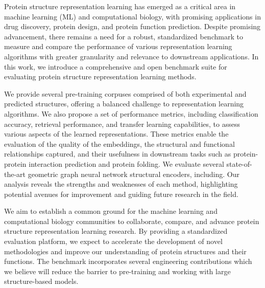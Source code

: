 Protein structure representation learning has emerged as a critical area in machine learning (ML) and computational biology, with promising applications in drug discovery, protein design, and protein function prediction. Despite promising advancement, there remains a need for a robust, standardized benchmark to measure and compare the performance of various representation learning algorithms with greater granularity and relevance to downstream applications. In this work, we introduce a comprehensive and open benchmark suite for evaluating protein structure representation learning methods.

We provide several pre-training corpuses comprised of both experimental and predicted structures, offering a balanced challenge to representation learning algorithms. We also propose a set of performance metrics, including classification accuracy, retrieval performance, and transfer learning capabilities, to assess various aspects of the learned representations. These metrics enable the evaluation of the quality of the embeddings, the structural and functional relationships captured, and their usefulness in downstream tasks such as protein-protein interaction prediction and protein folding. We evaluate several state-of-the-art geometric graph neural network structural encoders, including. Our analysis reveals the strengths and weaknesses of each method, highlighting potential avenues for improvement and guiding future research in the field.

We aim to establish a common ground for the machine learning and computational biology communities to collaborate, compare, and advance protein structure representation learning research. By providing a standardized evaluation platform, we expect to accelerate the development of novel methodologies and improve our understanding of protein structures and their functions. The benchmark incorporates several engineering contributions which we believe will reduce the barrier to pre-training and working with large structure-based models.